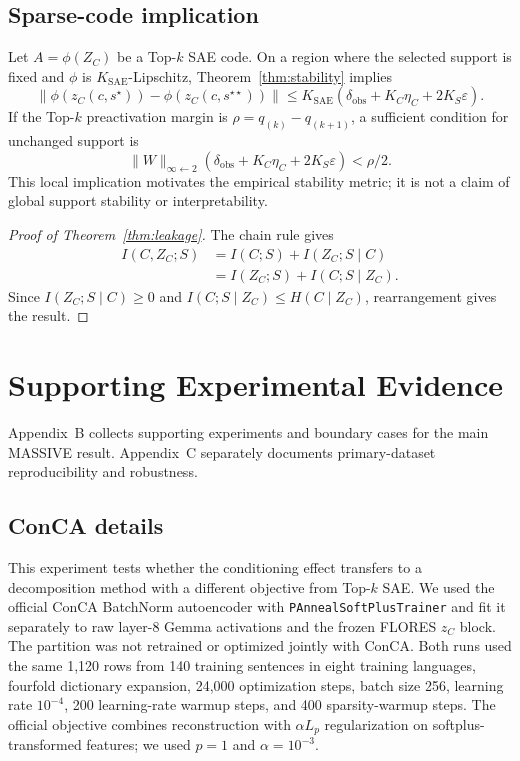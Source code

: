 \documentclass[11pt]{article}
\newcommand{\zC}{z_C}
\begin{document}
\subsection{Sparse-code implication}
Let $A=\phi(Z_C)$ be a Top-$k$ SAE code. On a region where the selected support is fixed and $\phi$ is $K_{\mathrm{SAE}}$-Lipschitz, Theorem~\ref{thm:stability} implies
\begin{equation}
\lVert\phi(\zC(c,s^\star))-\phi(\zC(c,s^{\star\star}))\rVert
\leq K_{\mathrm{SAE}}(\delta_{\mathrm{obs}}+K_C\eta_C+2K_S\varepsilon).
\end{equation}
If the Top-$k$ preactivation margin is $\rho=q_{(k)}-q_{(k+1)}$, a sufficient condition for unchanged support is
\begin{equation}
\lVert W\rVert_{\infty\leftarrow2}
(\delta_{\mathrm{obs}}+K_C\eta_C+2K_S\varepsilon)<\rho/2.
\end{equation}
This local implication motivates the empirical stability metric; it is not a claim of global support stability or interpretability.

\begin{proof}[Proof of Theorem~\ref{thm:leakage}]
The chain rule gives
\begin{align}
I(C,Z_C;S)&=I(C;S)+I(Z_C;S\mid C)\\
&=I(Z_C;S)+I(C;S\mid Z_C).
\end{align}
Since $I(Z_C;S\mid C)\geq0$ and $I(C;S\mid Z_C)\leq H(C\mid Z_C)$, rearrangement gives the result.
\end{proof}

\section{Supporting Experimental Evidence}
\label{app:supporting-evidence}
Appendix~B collects supporting experiments and boundary cases for the main MASSIVE result. Appendix~C separately documents primary-dataset reproducibility and robustness.

\subsection{ConCA details}
This experiment tests whether the conditioning effect transfers to a decomposition method with a different objective from Top-$k$ SAE. We used the official ConCA BatchNorm autoencoder \citep{liu2026conca} with \texttt{PAnnealSoftPlusTrainer} and fit it separately to raw layer-8 Gemma activations and the frozen FLORES $z_C$ block. The partition was not retrained or optimized jointly with ConCA. Both runs used the same 1,120 rows from 140 training sentences in eight training languages, fourfold dictionary expansion, 24,000 optimization steps, batch size 256, learning rate $10^{-4}$, 200 learning-rate warmup steps, and 400 sparsity-warmup steps. The official objective combines reconstruction with $\alpha L_p$ regularization on softplus-transformed features; we used $p=1$ and $\alpha=10^{-3}$.
\end{document}
